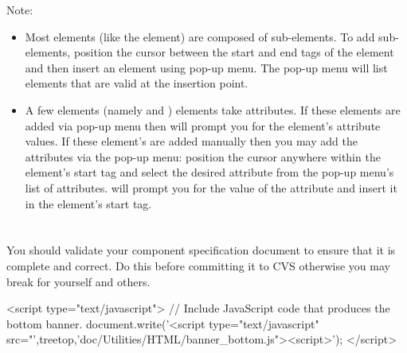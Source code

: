 \documentclass[11pt]{article}
\begin{document}
Note:

\begin{itemize}
\item Most elements (like the  element) are composed of
  sub-elements.  To add sub-elements, position the cursor between the
  start and end tags of the element and then insert an element using
  \emacs{} pop-up menu.  The pop-up menu will list elements that are
  valid at the insertion point.
\item A few elements (namely  and )
  elements take attributes.  If these elements are added via \emacs{}
  pop-up menu then \emacs{} will prompt you for the element's
  attribute values.  If these element's are added manually then you
  may add the attributes via the pop-up menu: position the cursor
  anywhere within the element's start tag and select the desired
  attribute from the pop-up menu's list of attributes.  \Emacs{} will
  prompt you for the value of the attribute and insert it in the
  element's start tag.
\end{itemize}

\section{\SECvalidation}
\label{\SECvalidation}

You should  validate your component specification document to ensure that it
is complete and correct.  Do this before committing it to CVS otherwise you
may break \sr{} for yourself and others.  

\begin{rawhtml}
<script type="text/javascript">
// Include JavaScript code that produces the bottom banner.
document.write('<script type="text/javascript" src="',treetop,'doc/Utilities/HTML/banner_bottom.js"><\/script>');
</script>
\end{rawhtml}
\end{document}
